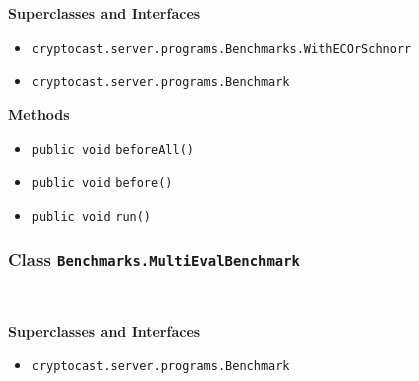 \textbf{\sffamily Superclasses and Interfaces}
\begin{itemize}
\item \lstinline|cryptocast.server.programs.Benchmarks.WithECOrSchnorr|
\item \lstinline|cryptocast.server.programs.Benchmark|
\end{itemize}



\textbf{\sffamily Methods}
\begin{itemize}
\item \lstinline|public void| \lstinline|beforeAll|\lstinline|()| \\[-0.6em]




\item \lstinline|public void| \lstinline|before|\lstinline|()| \\[-0.6em]




\item \lstinline|public void| \lstinline|run|\lstinline|()| \\[-0.6em]




\end{itemize}

\subsubsection{Class \lstinline|Benchmarks.MultiEvalBenchmark|}
 \\
\noindent\begin{minipage}[t]{5cm}
\vspace{0.3em}
\hspace*{2em}
\vspace{0.3em}
\end{minipage}



\textbf{\sffamily Superclasses and Interfaces}
\begin{itemize}
\item \lstinline|cryptocast.server.programs.Benchmark|
\end{itemize}



